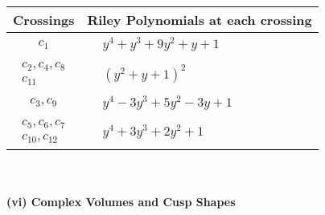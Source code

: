 \documentclass[1p]{elsarticle_modified}
\theoremstyle{definition}
\begin{document}
\begin{tabular}{m{50pt}|m{274pt}}
Crossings & \hspace{64pt}Riley Polynomials at each crossing \\
\hline $$\begin{aligned}c_{1}\end{aligned}$$&$\begin{aligned}
&y^4+y^3+9 y^2+y+1
\end{aligned}$\\
\hline $$\begin{aligned}c_{2},c_{4},c_{8}\\c_{11}\end{aligned}$$&$\begin{aligned}
&(y^2+y+1)^2
\end{aligned}$\\
\hline $$\begin{aligned}c_{3},c_{9}\end{aligned}$$&$\begin{aligned}
&y^4-3 y^3+5 y^2-3 y+1
\end{aligned}$\\
\hline $$\begin{aligned}c_{5},c_{6},c_{7}\\c_{10},c_{12}\end{aligned}$$&$\begin{aligned}
&y^4+3 y^3+2 y^2+1
\end{aligned}$\\
\hline
\end{tabular}\\~\\
\newpage\flushleft \textbf{(vi) Complex Volumes and Cusp Shapes}
\end{document}
